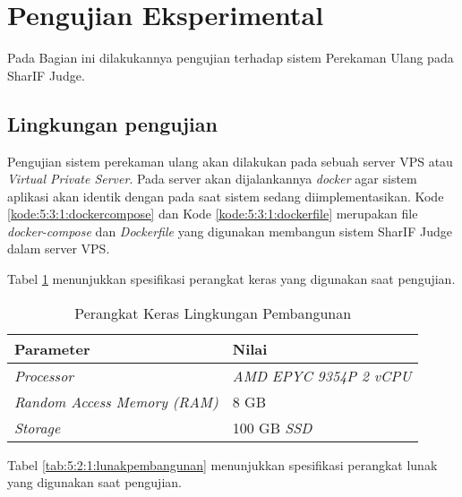 \section{Pengujian Eksperimental}
\label{sec:5:eksperimental}

Pada Bagian ini dilakukannya pengujian terhadap sistem Perekaman Ulang pada SharIF Judge.

\subsection{Lingkungan pengujian}
Pengujian sistem perekaman ulang akan dilakukan pada sebuah server VPS atau \textit{Virtual Private Server}. Pada server akan dijalankannya \textit{docker} agar sistem aplikasi akan identik dengan pada saat sistem sedang diimplementasikan. Kode \ref{kode:5:3:1:dockercompose} dan Kode \ref{kode:5:3:1:dockerfile} merupakan file \textit{docker-compose} dan \textit{Dockerfile} yang digunakan membangun sistem SharIF Judge dalam server VPS.

Tabel \ref{tab:5:1:keraspembangunan} menunjukkan spesifikasi perangkat keras yang digunakan saat pengujian.
\begin{table}[H]
    \caption{Perangkat Keras Lingkungan Pembangunan}
    \label{tab:5:1:keraspembangunan}
    \centering
    \begin{tabular}{|l|l|}
        \hline
        \textbf{Parameter}                  & \textbf{Nilai}              \\ \hline
        \textit{Processor}                  & \textit{AMD EPYC 9354P 2 vCPU} \\ \hline
        \textit{Random Access Memory (RAM)} & 8 GB                       \\ \hline
        \textit{Storage}                    & 100 GB \textit{SSD}           \\ \hline
    \end{tabular}
\end{table}

Tabel \ref{tab:5:2:1:lunakpembangunan} menunjukkan spesifikasi perangkat lunak yang digunakan saat pengujian.

